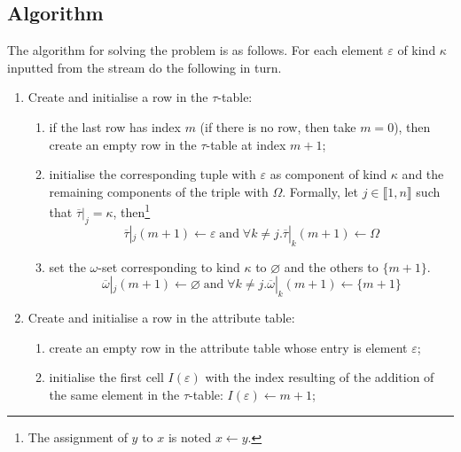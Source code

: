 \subsection{Algorithm}

The algorithm for solving the problem is as follows. For each
element \(\varepsilon\) of kind \(\kappa\) inputted from the \XML
stream do the following in turn.
\begin{enumerate}

  \item \label{algo:tau_insertion} Create and initialise a row in the
    \(\tau\)-table:
  \begin{enumerate} 

    \item \label{algo:tau_insertion:1} if the last row has index \(m\)
      (if there is no row, then take \(m=0\)), then create an empty
      row in the \(\tau\)-table at index \(m+1\);

    \item \label{algo:tau_insertion:2} initialise the corresponding
      tuple with \(\varepsilon\) as component of kind \(\kappa\) and the
      remaining components of the triple with \(\Omega\). Formally,
      let \(j \in \llbracket 1, n \rrbracket\) such that
      \(\overline{\tau}|_j=\kappa\), then\footnote{The assignment of
        \(y\) to \(x\) is noted \(x \leftarrow y\).}
      \[
       \overline{\tau}|_j(m+1) \leftarrow \varepsilon \; \text{and} \;
       \forall k \neq j.\overline{\tau}|_k(m+1) \leftarrow \Omega
      \]

    \item \label{algo:tau_insertion:3} set the \(\omega\)-set
      corresponding to kind \(\kappa\) to \(\varnothing\) and the
      others to \(\{m+1\}\).
    \[
      \overline{\omega}|_j(m+1) \leftarrow \varnothing \; \text{and}
      \; \forall k \neq j.\overline{\omega}|_k(m+1) \leftarrow \{m+1\}
    \]
  
  \end{enumerate}

  \item \label{algo:attr_insertion} Create and initialise a row in the
    attribute table:
  \begin{enumerate}

    \item \label{algo:attr_insertion:1} create an empty row in the
      attribute table whose entry is element \(\varepsilon\);

    \item \label{algo:attr_insertion:2} initialise the first cell
      \(I(\varepsilon)\) with the index resulting of the addition of
      the same element in the \(\tau\)-table: \(I(\varepsilon)
      \leftarrow m+1\);


\end{enumerate}
\end{enumerate}
